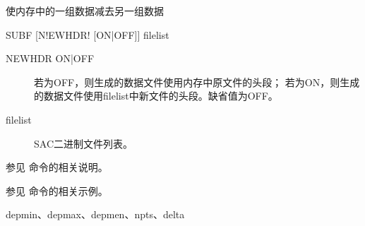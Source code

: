 \label{cmd:subf}

使内存中的一组数据减去另一组数据

\begin{SACSTX}
SUBF [N!EWHDR! [ON|OFF]] filelist
\end{SACSTX}

\begin{description}
\item [NEWHDR ON|OFF] 若为OFF，则生成的数据文件使用内存中原文件的头段；
    若为ON，则生成的数据文件使用filelist中新文件的头段。缺省值为OFF。
\item [filelist] SAC二进制文件列表。
\end{description}

参见  命令的相关说明。

参见  命令的相关示例。

depmin、depmax、depmen、npts、delta
